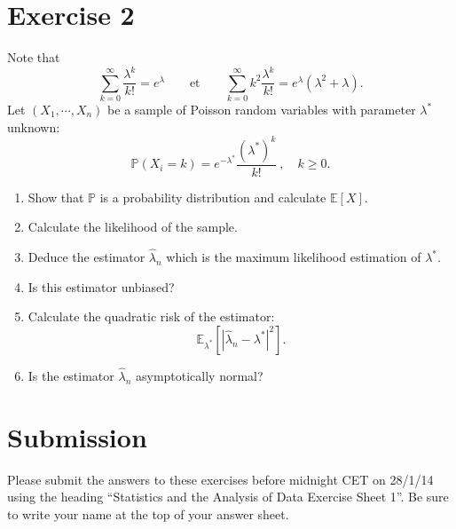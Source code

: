 \documentclass[a4paper,10pt]{article}
\begin{document}
\section*{Exercise 2}

Note that  
$$\sum_{k=0}^\infty \frac{\lambda^k}{k!} = e^\lambda\qquad\textrm{et}\qquad \sum_{k=0}^\infty k^2 \frac{ \lambda^k}{k!}=e^{\lambda}(\lambda^2 + \lambda).
$$ 
Let $(X_1,\cdots, X_n)$ be a sample of Poisson random variables with parameter $\lambda^*$ unknown:
$$
\mathbb{P}(X_i=k) = e^{-\lambda^*} \frac{(\lambda^*)^k}{k!}\ ,\quad k\ge 0.
$$
\begin{enumerate}
\item Show that $\mathbb{P}$ is a probability distribution and calculate $\mathbb{E}[X]$.
\item Calculate the likelihood of the sample. 
\item Deduce the estimator $\hat{\lambda}_n$ which is the maximum likelihood estimation of $\lambda^*$.
\item Is this estimator unbiased? 
\item Calculate the quadratic risk of the estimator:
$$
\mathbb{E}_{\lambda^*}\left[ \left| \hat \lambda_n -\lambda^*\right|^2\right].
$$
\item Is the estimator $\hat \lambda_n$  asymptotically normal?
\end{enumerate}

\section*{Submission}

Please submit the answers to these exercises before midnight CET on 28/1/14 using the heading ``Statistics and the Analysis of Data Exercise Sheet 1''. Be sure to write your name at the top of your answer sheet. 
\end{document}
